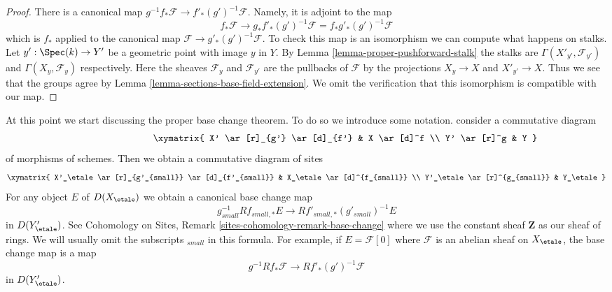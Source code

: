 \begin{proof}
There is a canonical map $g^{-1}f_*\mathcal{F} \to f'_*(g')^{-1}\mathcal{F}$.
Namely, it is adjoint to the map
$$
f_*\mathcal{F} \longrightarrow
g_*f'_*(g')^{-1}\mathcal{F} = f_*g'_*(g')^{-1}\mathcal{F}
$$
which is $f_*$ applied to the canonical map
$\mathcal{F} \to g'_*(g')^{-1}\mathcal{F}$. To check this map is an
isomorphism we can compute what happens on stalks.
Let $y' : \Spec(k) \to Y'$ be a geometric point with image $y$ in $Y$.
By Lemma \ref{lemma-proper-pushforward-stalk} the stalks are
$\Gamma(X'_{y'}, \mathcal{F}_{y'})$ and $\Gamma(X_y, \mathcal{F}_y)$
respectively. Here the sheaves $\mathcal{F}_y$ and $\mathcal{F}_{y'}$
are the pullbacks of $\mathcal{F}$ by the projections $X_y \to X$
and $X'_{y'} \to X$. Thus we see that the groups agree by
Lemma \ref{lemma-sections-base-field-extension}. We omit the
verification that this isomorphism is compatible with our map.
\end{proof}


\noindent
At this point we start discussing the proper base change theorem.
To do so we introduce some notation. consider a commutative diagram
\begin{equation}
\label{equation-base-change-diagram}
\vcenter{
\xymatrix{
X' \ar[r]_{g'} \ar[d]_{f'} & X \ar[d]^f \\
Y' \ar[r]^g & Y
}
}
\end{equation}
of morphisms of schemes. Then we obtain a commutative diagram of sites
$$
\xymatrix{
X'_\etale \ar[r]_{g'_{small}} \ar[d]_{f'_{small}} &
X_\etale \ar[d]^{f_{small}} \\
Y'_\etale \ar[r]^{g_{small}} &
Y_\etale
}
$$
For any object $E$ of $D(X_\etale)$ we obtain a canonical base change map
\begin{equation}
\label{equation-base-change}
g_{small}^{-1}Rf_{small, *}E \longrightarrow Rf'_{small, *}(g'_{small})^{-1}E
\end{equation}
in $D(Y'_\etale)$. See Cohomology on Sites, Remark
\ref{sites-cohomology-remark-base-change} where we use the constant
sheaf $\mathbf{Z}$ as our sheaf of rings.
We will usually omit the subscripts ${}_{small}$ in this formula.
For example, if $E = \mathcal{F}[0]$ where $\mathcal{F}$ is an abelian
sheaf on $X_\etale$, the base change map is a map
\begin{equation}
\label{equation-base-change-sheaf}
g^{-1}Rf_*\mathcal{F} \longrightarrow Rf'_*(g')^{-1}\mathcal{F}
\end{equation}
in $D(Y'_\etale)$.

